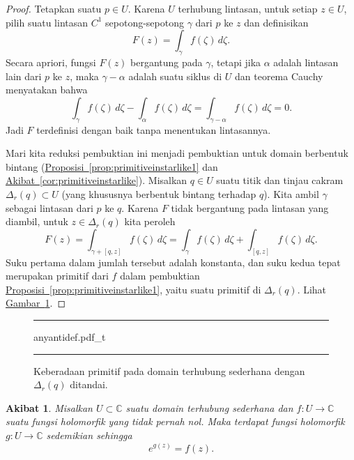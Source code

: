 \documentclass[12pt,openany]{book}
\newcommand{\C}{{\mathbb{C}}}
\theoremstyle{plain}
\newtheorem{cor}[thm]{Akibat}
\theoremstyle{remark}
\theoremstyle{definition}
\newenvironment{myfig}{%
\begin{figure}[h!t]
\noindent\rule{\textwidth}{0.5pt}\vspace{12pt}\par\centering}%
{\par\noindent\rule{\textwidth}{0.5pt}
\end{figure}}
\theoremstyle{exercise}
\theoremstyle{example}
\newcommand{\figureref}[1]{\hyperref[#1]{Gambar~\ref*{#1}}}
\newcommand{\propref}[1]{\hyperref[#1]{Proposisi~\ref*{#1}}}
\newcommand{\corref}[1]{\hyperref[#1]{Akibat~\ref*{#1}}}
\begin{document}
\begin{proof}
Tetapkan suatu $p \in U$. Karena $U$ terhubung lintasan, untuk setiap $z \in U$, pilih
suatu lintasan $C^1$ sepotong-sepotong $\gamma$ dari $p$ ke $z$
dan definisikan
\begin{equation*}
F(z) = \int_\gamma f(\zeta) \, d\zeta .
\end{equation*}
Secara apriori, fungsi $F(z)$ bergantung pada $\gamma$, tetapi
jika $\alpha$ adalah lintasan lain dari $p$ ke $z$, maka
$\gamma-\alpha$ adalah suatu siklus di $U$ dan
teorema Cauchy menyatakan bahwa
\begin{equation*}
\int_\gamma f(\zeta) \, d\zeta -
\int_\alpha f(\zeta) \, d\zeta 
=
\int_{\gamma-\alpha} f(\zeta) \, d\zeta  =  0 .
\end{equation*}
Jadi $F$ terdefinisi dengan baik tanpa menentukan lintasannya.

Mari kita reduksi pembuktian ini menjadi pembuktian untuk 
domain berbentuk bintang (\propref{prop:primitiveinstarlike1} dan
\corref{cor:primitiveinstarlike}).
Misalkan $q \in U$ suatu titik dan tinjau cakram $\Delta_r(q) \subset U$
(yang khususnya berbentuk bintang terhadap $q$).
Kita ambil $\gamma$ sebagai lintasan dari $p$ ke $q$.
Karena $F$ tidak bergantung pada lintasan yang diambil, untuk $z \in \Delta_r(q)$ kita peroleh
\begin{equation*}
F(z) =
\int_{\gamma+[q,z]} f(\zeta) \, d\zeta
=
\int_{\gamma} f(\zeta) \, d\zeta
+
\int_{[q,z]} f(\zeta) \, d\zeta .
\end{equation*}
Suku pertama dalam jumlah tersebut adalah konstanta, dan suku kedua tepat merupakan
primitif dari $f$ dalam pembuktian
\propref{prop:primitiveinstarlike1},
yaitu suatu primitif di
$\Delta_r(q)$.
Lihat \figureref{fig:anyantidef}.
\end{proof}

\begin{myfig}
{anyantidef.pdf_t}
\caption{Keberadaan primitif pada domain terhubung sederhana
dengan $\Delta_r(q)$ ditandai.\label{fig:anyantidef}}
\end{myfig}

\begin{cor} \label{cor:simplyconimpleslog}
Misalkan $U \subset \C$ suatu domain terhubung sederhana dan
$f \colon U \to \C$ suatu fungsi holomorfik yang tidak pernah nol.
Maka terdapat fungsi holomorfik $g \colon U \to \C$
sedemikian sehingga
\begin{equation*}
e^{g(z)} = f(z) .
\end{equation*}
\end{cor}
\end{document}
